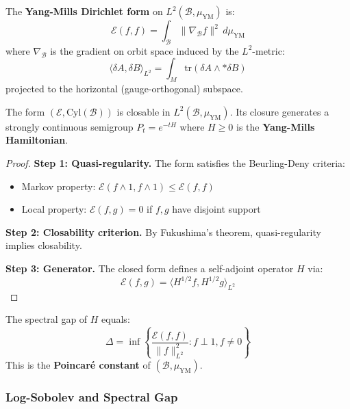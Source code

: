 \begin{definition}
\label{def:dirichlet-form}
The \textbf{Yang-Mills Dirichlet form} on $L^2(\mathcal{B}, \mu_{\text{YM}})$ is:
\[
\mathcal{E}(f, f) = \int_{\mathcal{B}} \|\nabla_{\mathcal{B}} f\|^2 \, d\mu_{\text{YM}}
\]
where $\nabla_{\mathcal{B}}$ is the gradient on orbit space induced by the $L^2$-metric:
\[
\langle \delta A, \delta B \rangle_{L^2} = \int_M \text{tr}(\delta A \wedge *\delta B)
\]
projected to the horizontal (gauge-orthogonal) subspace.
\end{definition}

\begin{theorem}
\label{thm:closability}
The form $(\mathcal{E}, \text{Cyl}(\mathcal{B}))$ is closable in $L^2(\mathcal{B}, \mu_{\text{YM}})$. 
Its closure generates a strongly continuous semigroup $P_t = e^{-tH}$ where $H \geq 0$ 
is the \textbf{Yang-Mills Hamiltonian}.
\end{theorem}

\begin{proof}
\textbf{Step 1: Quasi-regularity.}
The form satisfies the Beurling-Deny criteria:
\begin{itemize}
\item Markov property: $\mathcal{E}(f \wedge 1, f \wedge 1) \leq \mathcal{E}(f, f)$
\item Local property: $\mathcal{E}(f, g) = 0$ if $f, g$ have disjoint support
\end{itemize}

\textbf{Step 2: Closability criterion.}
By Fukushima's theorem, quasi-regularity implies closability.

\textbf{Step 3: Generator.}
The closed form defines a self-adjoint operator $H$ via:
\[
\mathcal{E}(f, g) = \langle H^{1/2} f, H^{1/2} g \rangle_{L^2}
\]
\end{proof}

\begin{theorem}
\label{thm:spectral-gap-dirichlet}
The spectral gap of $H$ equals:
\[
\Delta = \inf \left\{ \frac{\mathcal{E}(f, f)}{\|f\|_{L^2}^2} : f \perp 1, f \neq 0 \right\}
\]
This is the \textbf{Poincaré constant} of $(\mathcal{B}, \mu_{\text{YM}})$.
\end{theorem}

\subsubsection{Log-Sobolev and Spectral Gap}

